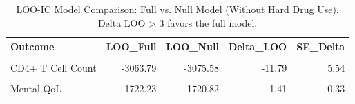\begin{table}[!h]
\centering
\caption{\label{tab:loo-comparison}LOO-IC Model Comparison: Full vs. Null Model (Without Hard Drug Use). Delta LOO > 3 favors the full model.}
\centering
\begin{tabular}[t]{lrrrr}
\toprule
Outcome & LOO\_Full & LOO\_Null & Delta\_LOO & SE\_Delta\\
\midrule
\cellcolor{gray!10}{Log10 Viral Load} & \cellcolor{gray!10}{-719.72} & \cellcolor{gray!10}{-718.68} & \cellcolor{gray!10}{-1.05} & \cellcolor{gray!10}{0.26}\\
CD4+ T Cell Count & -3063.79 & -3075.58 & -11.79 & 5.54\\
\cellcolor{gray!10}{Physical QoL} & \cellcolor{gray!10}{-1612.86} & \cellcolor{gray!10}{-1614.57} & \cellcolor{gray!10}{-1.71} & \cellcolor{gray!10}{2.66}\\
Mental QoL & -1722.23 & -1720.82 & -1.41 & 0.33\\
\bottomrule
\end{tabular}
\end{table}
